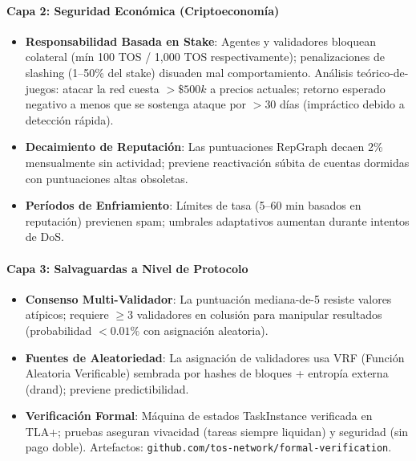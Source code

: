 \documentclass[11pt]{article}
\begin{document}
\paragraph{Capa 2: Seguridad Económica (Criptoeconomía)}
\begin{itemize}[noitemsep]
  \item \textbf{Responsabilidad Basada en Stake}: Agentes y validadores bloquean colateral (mín 100 TOS / 1,000 TOS respectivamente); penalizaciones de slashing (1--50\% del stake) disuaden mal comportamiento. Análisis teórico-de-juegos: atacar la red cuesta $>\$500k$ a precios actuales; retorno esperado negativo a menos que se sostenga ataque por $>30$ días (impráctico debido a detección rápida).
  \item \textbf{Decaimiento de Reputación}: Las puntuaciones RepGraph decaen 2\% mensualmente sin actividad; previene reactivación súbita de cuentas dormidas con puntuaciones altas obsoletas.
  \item \textbf{Períodos de Enfriamiento}: Límites de tasa (5--60 min basados en reputación) previenen spam; umbrales adaptativos aumentan durante intentos de DoS.
\end{itemize}

\paragraph{Capa 3: Salvaguardas a Nivel de Protocolo}
\begin{itemize}[noitemsep]
  \item \textbf{Consenso Multi-Validador}: La puntuación mediana-de-5 resiste valores atípicos; requiere $\geq3$ validadores en colusión para manipular resultados (probabilidad $<0.01\%$ con asignación aleatoria).
  \item \textbf{Fuentes de Aleatoriedad}: La asignación de validadores usa VRF (Función Aleatoria Verificable) sembrada por hashes de bloques + entropía externa (drand); previene predictibilidad.
  \item \textbf{Verificación Formal}: Máquina de estados TaskInstance verificada en TLA+; pruebas aseguran vivacidad (tareas siempre liquidan) y seguridad (sin pago doble). Artefactos: \texttt{github.com/tos-network/formal-verification}.
\end{itemize}
\end{document}
